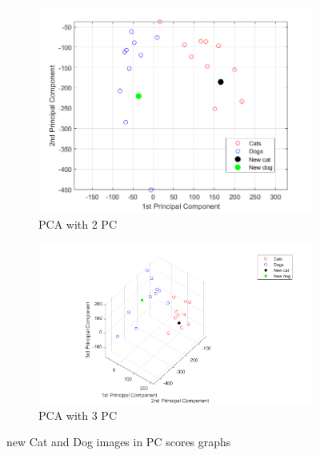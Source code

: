 \documentclass[a4paper]{iacas}
\begin{document}
\vskip 0.1in
\begin{figure}[!htbp]
	\begin{subfigure}{0.8\linewidth}
		\centering
		\includegraphics[width=\linewidth]{imgs/scatter_2d_new_imgs.png}
		\caption{PCA with 2 PC}
	\end{subfigure}
	\vskip 0.1in
	\begin{subfigure}{0.8\linewidth}
		\centering
		\includegraphics[width=\linewidth]{imgs/scatter_3d_new_imgs.png}
		\caption{PCA with 3 PC}
	\end{subfigure}
	\caption{new Cat and Dog images in PC scores graphs}
	\label{new Cat and Dog images in PC scores graphs}
\end{figure}
\vskip 0.1in
\end{document}
